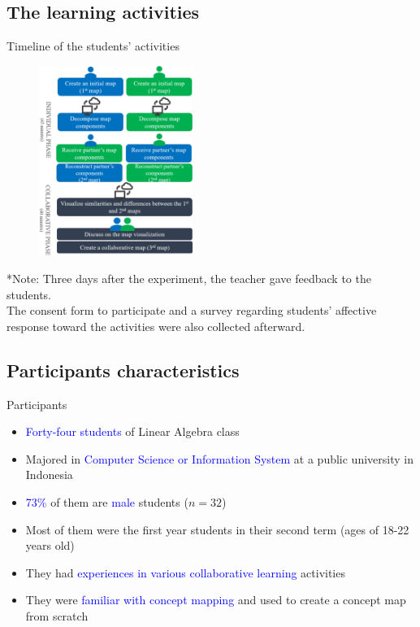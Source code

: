 \subsection{The learning activities}
\begin{frame}{Timeline of the students' activities}
    \begin{figure}[tb]
        \begin{center}
            \includegraphics[width=50mm]{images/rqb_learner-activities.pdf}
        \end{center}
    \end{figure}
    {\tiny **Note: Three days after the experiment, the teacher gave feedback to the students. \\
    The consent form to participate and a survey regarding students' affective response
    toward the activities were also collected afterward. }

\end{frame}

\subsection{Participants characteristics}
\begin{frame}{Participants}

\begin{itemize}
    \item <1-> \textcolor{blue}{Forty-four students} of Linear Algebra class
    \item <1-> Majored in \textcolor{blue}{Computer Science or Information System} at a public university in Indonesia
    \item <1> \textcolor{blue}{73\%} of them are \textcolor{blue}{male} students ($n = 32$)
    \item <1> Most of them were the first year students in their second term (ages of 18-22 years old)
    \item <2-> They had \textcolor{blue}{experiences in various collaborative learning} activities
    \item <2-> They were \textcolor{blue}{familiar with concept mapping} and used to create a concept map from scratch
\end{itemize}

\end{frame}

